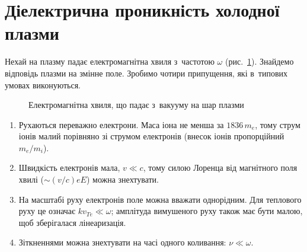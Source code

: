 \section{Діелектрична проникність холодної плазми}\label{sec:plasma-permittivity}



Нехай на плазму падає електромагнітна хвиля з~частотою $\omega$ (рис.~\ref{tikz:emwave}).
Знайдемо відповідь плазми на змінне поле. Зробимо чотири припущення, які в~типових умовах
виконуються.

\begin{figure}[h!]\centering
{}
\caption{Електромагнітна хвиля, що падає з~вакууму на шар плазми}
\label{tikz:emwave}
\end{figure}
\begin{enumerate}
	\item Рухаються переважно електрони. Маса іона не менша за $1836\,m_e$, тому струм
	  іонів малий порівняно зі струмом електронів (внесок іонів пропорційний $m_e/m_i$).
	\item Швидкість електронів мала, $v\ll c$, тому силою Лоренца від магнітного поля
	  хвилі ($\sim(v/c)eE$) можна знехтувати.
	\item На масштабі руху електронів поле можна вважати однорідним. Для теплового руху це
	  означає $kv_{Te}\ll\omega$; амплітуда вимушеного руху також має бути малою, щоб
	  зберігалася лінеаризація.
	\item Зіткненнями можна знехтувати на часі одного коливання: $\nu\ll\omega$.
\end{enumerate}

